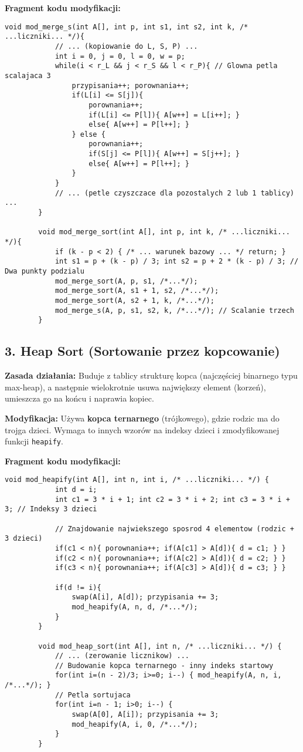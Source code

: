 \documentclass[12pt, a4paper]{article} %
\begin{document}
	\textbf{Fragment kodu modyfikacji:}
	\begin{lstlisting}[caption={Fragment modyfikacji Merge Sort - scalanie 3 części}, label={lst:mergemod}]
		void mod_merge_s(int A[], int p, int s1, int s2, int k, /* ...liczniki... */){
			// ... (kopiowanie do L, S, P) ...
			int i = 0, j = 0, l = 0, w = p;
			while(i < r_L && j < r_S && l < r_P){ // Glowna petla scalajaca 3
				przypisania++; porownania++;
				if(L[i] <= S[j]){
					porownania++;
					if(L[i] <= P[l]){ A[w++] = L[i++]; }
					else{ A[w++] = P[l++]; }
				} else {
					porownania++;
					if(S[j] <= P[l]){ A[w++] = S[j++]; }
					else{ A[w++] = P[l++]; }
				}
			}
			// ... (petle czyszczace dla pozostalych 2 lub 1 tablicy) ...
		}
		
		void mod_merge_sort(int A[], int p, int k, /* ...liczniki... */){
			if (k - p < 2) { /* ... warunek bazowy ... */ return; }
			int s1 = p + (k - p) / 3; int s2 = p + 2 * (k - p) / 3; // Dwa punkty podzialu
			mod_merge_sort(A, p, s1, /*...*/);
			mod_merge_sort(A, s1 + 1, s2, /*...*/);
			mod_merge_sort(A, s2 + 1, k, /*...*/);
			mod_merge_s(A, p, s1, s2, k, /*...*/); // Scalanie trzech
		}
	\end{lstlisting}
	
	\newpage
	\subsection*{3. Heap Sort (Sortowanie przez kopcowanie)}
	\textbf{Zasada działania:} Buduje z tablicy strukturę kopca (najczęściej binarnego typu max-heap), a następnie wielokrotnie usuwa największy element (korzeń), umieszcza go na końcu i naprawia kopiec.
	
	\textbf{Modyfikacja:} Używa \textbf{kopca ternarnego} (trójkowego), gdzie rodzic ma do trojga dzieci. Wymaga to innych wzorów na indeksy dzieci i zmodyfikowanej funkcji \texttt{heapify}.
	
	\textbf{Fragment kodu modyfikacji:}
	\begin{lstlisting}[caption={Fragment modyfikacji Heap Sort - kopiec ternarny}, label={lst:heapmod}]
		void mod_heapify(int A[], int n, int i, /* ...liczniki... */) {
			int d = i;
			int c1 = 3 * i + 1; int c2 = 3 * i + 2; int c3 = 3 * i + 3; // Indeksy 3 dzieci
			
			// Znajdowanie najwiekszego sposrod 4 elementow (rodzic + 3 dzieci)
			if(c1 < n){ porownania++; if(A[c1] > A[d]){ d = c1; } }
			if(c2 < n){ porownania++; if(A[c2] > A[d]){ d = c2; } }
			if(c3 < n){ porownania++; if(A[c3] > A[d]){ d = c3; } }
			
			if(d != i){
				swap(A[i], A[d]); przypisania += 3;
				mod_heapify(A, n, d, /*...*/);
			}
		}
		
		void mod_heap_sort(int A[], int n, /* ...liczniki... */) {
			// ... (zerowanie licznikow) ...
			// Budowanie kopca ternarnego - inny indeks startowy
			for(int i=(n - 2)/3; i>=0; i--) { mod_heapify(A, n, i, /*...*/); }
			// Petla sortujaca
			for(int i=n - 1; i>0; i--) {
				swap(A[0], A[i]); przypisania += 3;
				mod_heapify(A, i, 0, /*...*/);
			}
		}
	\end{lstlisting}
	
\end{document}

